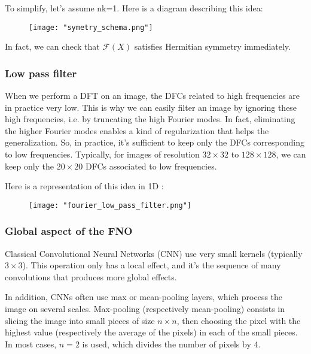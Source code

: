 To simplify, let's assume nk=1. Here is a diagram describing this idea:

\begin{figure}[H]
	\centering
	\texttt{[image: "symetry\_schema.png"]}
\end{figure}

\begin{Rem}
	In fact, we can check that $\mathcal{F}(X)$ satisfies Hermitian symmetry immediately.
\end{Rem}

\subsubsection{Low pass filter}

When we perform a DFT on an image, the DFCs related to high frequencies are in practice very low. This is why we can easily filter an image by ignoring these high frequencies, i.e. by truncating the high Fourier modes. In fact, eliminating the higher Fourier modes enables a kind of regularization that helps the generalization. So, in practice, it's sufficient to keep only the DFCs corresponding to low frequencies. Typically, for images of resolution $32\times 32$ to $128\times 128$, we can keep only the $20\times 20$ DFCs associated to low frequencies.

Here is a representation of this idea in 1D :

\begin{figure}[H]
	\centering
	\texttt{[image: "fourier\_low\_pass\_filter.png"]}
\end{figure}

\subsubsection{Global aspect of the FNO}

Classical Convolutional Neural Networks (CNN) use very small kernels (typically $3\times 3$). This operation only has a local effect, and it's the sequence of many convolutions that produces more global effects. 

In addition, CNNs often use max or mean-pooling layers, which process the image on several scales. Max-pooling (respectively mean-pooling) consists in slicing the image into small pieces of size $n\times n$, then choosing the pixel with the highest value (respectively the average of the pixels) in each of the small pieces. In most cases, $n=2$ is used, which divides the number of pixels by 4.

